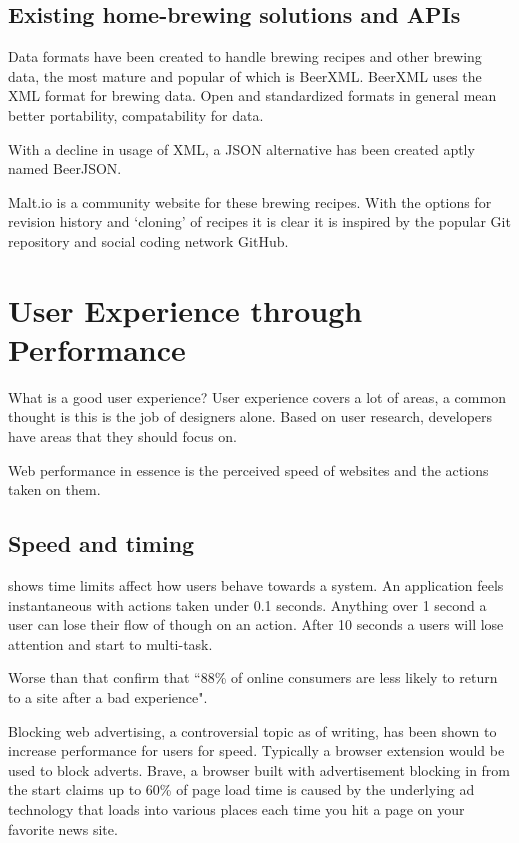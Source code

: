 \subsection{Existing home-brewing solutions and APIs}

Data formats have been created to handle brewing recipes and other brewing data, the most mature and popular of which is BeerXML. BeerXML uses the XML format for brewing data. \cite{beerxml} Open and standardized formats in general mean better portability, compatability for data.

With a decline in usage of XML, a JSON alternative has been created aptly named BeerJSON. \cite{beerjson}

Malt.io is a community website for these brewing recipes. With the options for revision history and `cloning' of recipes it is clear it is inspired by the popular Git repository and social coding network GitHub. \cite{malt.io}

\section{User Experience through Performance} \label{l-r--user-experience-performance}

What is a good user experience? User experience covers a lot of areas, a common thought is this is the job of designers alone. Based on user research, developers have areas that they should focus on.

Web performance in essence is the perceived speed of websites and the actions taken on them.


\subsection{Speed and timing}

\cite{usability_engineering} shows time limits affect how users behave towards a system. An application feels instantaneous with actions taken under 0.1 seconds.  Anything over 1 second a user can lose their flow of though on an action. After 10 seconds a users will lose attention and start to multi-task.

Worse than that \cite{why_web_performance_matters} confirm that ``88\% of online consumers are less likely to return to a site after a bad experience".

Blocking web advertising, a controversial topic as of writing, has been shown to increase performance for users for speed. Typically a browser extension would be used to block adverts. Brave, a browser built with advertisement blocking in from the start claims up to 60\% of page load time is caused by the underlying ad technology that loads into various places each time you hit a page on your favorite news site. \cite{brave}

